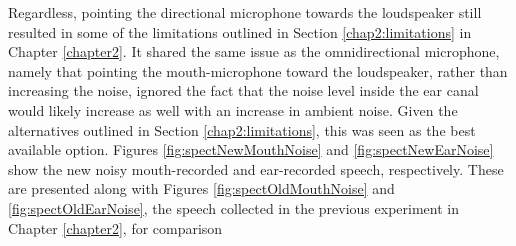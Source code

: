 Regardless, pointing the directional microphone towards the loudspeaker still resulted in some of the limitations outlined in Section \ref{chap2:limitations} in Chapter \ref{chapter2}.  
\DIFdelbegin %
{%
}
\DIFdelend It shared the same issue as the omnidirectional microphone, namely that pointing the mouth-microphone toward the loudspeaker, rather than increasing the noise, ignored the fact that the noise level inside the ear canal would likely increase as well with an increase in ambient noise.  Given the alternatives outlined in Section \ref{chap2:limitations}, this was seen as the best available option.  Figures \ref{fig:spectNewMouthNoise} and \ref{fig:spectNewEarNoise} show the new noisy mouth-recorded and ear-recorded speech, respectively.  These are presented along with Figures \ref{fig:spectOldMouthNoise} and \ref{fig:spectOldEarNoise}, the speech collected in the previous experiment in Chapter \ref{chapter2}, for comparison\DIFaddbegin {}\DIFaddend 

